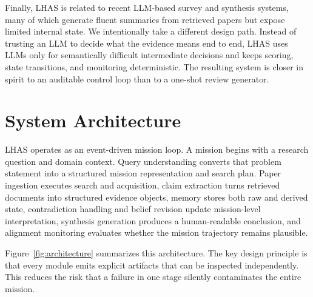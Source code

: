 \documentclass[manuscript,screen,review]{jair}
\begin{document}
Finally, LHAS is related to recent LLM-based survey and synthesis systems, many of which generate fluent summaries from retrieved papers but expose limited internal state. We intentionally take a different design path. Instead of trusting an LLM to decide what the evidence means end to end, LHAS uses LLMs only for semantically difficult intermediate decisions and keeps scoring, state transitions, and monitoring deterministic. The resulting system is closer in spirit to an auditable control loop than to a one-shot review generator.

\section{System Architecture}
LHAS operates as an event-driven mission loop. A mission begins with a research question and domain context. Query understanding converts that problem statement into a structured mission representation and search plan. Paper ingestion executes search and acquisition, claim extraction turns retrieved documents into structured evidence objects, memory stores both raw and derived state, contradiction handling and belief revision update mission-level interpretation, synthesis generation produces a human-readable conclusion, and alignment monitoring evaluates whether the mission trajectory remains plausible.

Figure~\ref{fig:architecture} summarizes this architecture. The key design principle is that every module emits explicit artifacts that can be inspected independently. This reduces the risk that a failure in one stage silently contaminates the entire mission.
\end{document}
